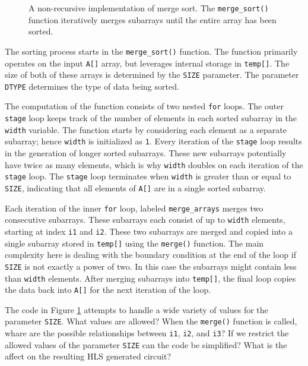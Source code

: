 \begin{figure}
{\tiny }
\caption{  A non-recursive implementation of merge sort. The \lstinline{merge_sort()} function iteratively merges subarrays until the entire array has been sorted. }
\label{fig:merge_sort.cpp}
\end{figure}

The sorting process starts in the \lstinline{merge_sort()} function. The function primarily operates on the input \lstinline{A[]} array, but leverages internal storage in \lstinline{temp[]}. The size of both of these arrays is determined by the \lstinline{SIZE} parameter. The parameter \lstinline{DTYPE} determines the type of data being sorted.

The computation of the function consists of two nested \lstinline{for} loops. The outer \lstinline{stage} loop keeps track of the number of elements in each sorted subarray in the \lstinline{width} variable. The function starts by considering each element as a separate subarray; hence \lstinline{width} is initialized as \lstinline{1}. Every iteration of the \lstinline{stage} loop results in the generation of longer sorted subarrays. These new subarrays potentially have twice as many elements, which is why \lstinline{width} doubles on each iteration of the \lstinline{stage} loop. The \lstinline{stage} loop terminates when \lstinline{width} is greater than or equal to \lstinline{SIZE}, indicating that all elements of \lstinline{A[]} are in a single sorted subarray.

Each iteration of the inner \lstinline{for} loop, labeled \lstinline{merge_arrays} merges two consecutive subarrays. These subarrays each consist of up to \lstinline{width} elements, starting at index \lstinline{i1} and \lstinline{i2}.  These two subarrays are merged and copied into a single subarray stored in \lstinline{temp[]} using the \lstinline{merge()} function.  The main complexity here is dealing with the boundary condition at the end of the loop if \lstinline{SIZE} is not exactly a power of two.  In this case the subarrays might contain less than \lstinline{width} elements. After merging subarrays into \lstinline{temp[]}, the final loop copies the data back into \lstinline{A[]} for the next iteration of the loop.

\begin{exercise}
The code in Figure \ref{fig:merge_sort.cpp} attempts to handle a wide variety of values for the parameter \lstinline{SIZE}.  What values are allowed?  When the \lstinline{merge()} function is called, whare are the possible relationships between \lstinline{i1}, \lstinline{i2}, and \lstinline{i3}?   If we restrict the allowed values of the parameter \lstinline{SIZE} can the code be simplified?  What is the affect on the resulting HLS generated circuit? 
\end{exercise}

